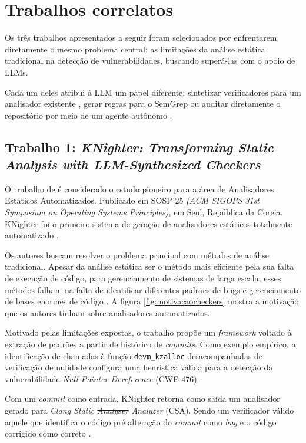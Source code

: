 \documentclass[
    12pt,                %
    openright,           %
    oneside,             %
    a4paper,             %
    english,             %
    brazil               %
]{abntex2}
\newcommand{\antigo}[1]{\sout{#1}}
\newcommand{\novo}[1]{{\color{red}#1}}
\begin{document}
\section{Trabalhos correlatos}
\label{sec:trabalhosrelacionados}
\par
Os três trabalhos apresentados a seguir foram selecionados por enfrentarem diretamente o mesmo problema central: as limitações da análise estática tradicional na detecção de vulnerabilidades, buscando superá-las com o apoio de LLMs.
\par
Cada um deles atribui à LLM um papel diferente: sintetizar verificadores para um analisador existente \cite{yang2025knighter}, gerar regras para o SemGrep \cite{hou2025generation} ou auditar diretamente o repositório por meio de um agente autônomo \cite{guo2025repoaudit}.

\subsection{Trabalho 1: \textit{KNighter: Transforming Static Analysis with LLM-Synthesized Checkers} \cite{yang2025knighter}}
\label{sec:knighter}
\par
O trabalho de  é considerado o estudo pioneiro para a área de Analisadores Estáticos Automatizados.
Publicado em SOSP 25 \textit{(ACM SIGOPS 31st Symposium on Operating Systems Principles)}, em Seul, República da Coreia.
KNighter foi o primeiro sistema de geração de analisadores estáticos totalmente automatizado \cite{yang2025knighter}.
\par
Os autores buscam resolver o problema principal com métodos de análise tradicional.
Apesar da análise estática ser o método mais eficiente pela sua falta de execução de código, para gerenciamento de sistemas de larga escala, esses métodos falham na falta de identificar diferentes padrões de bugs e gerenciamento de bases enormes de código \cite{yang2025knighter}.
A figura \ref{fig:motivacaocheckers} mostra a motivação que os autores tinham sobre analisadores automatizados.
\par
Motivado pelas limitações expostas, o trabalho propõe um \textit{framework} voltado à extração de padrões a partir de histórico de \textit{commits}.
Como exemplo empírico, a identificação de chamadas à função \texttt{devm\_kzalloc} desacompanhadas de verificação de nulidade configura uma heurística válida para a detecção da vulnerabilidade \textit{Null Pointer Dereference} (CWE-476) \cite{yang2025knighter}.
\par
Com um \textit{commit} como entrada, KNighter retorna como saída um analisador gerado para \textit{Clang Static \antigo{Analyser} \novo{Analyzer}} (CSA). Sendo um verificador válido aquele que identifica o código pré alteração do \textit{commit} como \textit{bug} e o código corrigido como correto \cite{yang2025knighter}.
\end{document}
